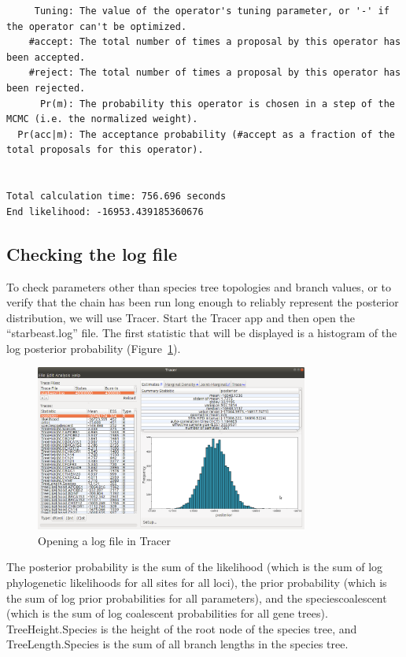 \documentclass[12pt]{article}
\begin{document}
\begin{verbatim}
     Tuning: The value of the operator's tuning parameter, or '-' if the operator can't be optimized.
    #accept: The total number of times a proposal by this operator has been accepted.
    #reject: The total number of times a proposal by this operator has been rejected.
      Pr(m): The probability this operator is chosen in a step of the MCMC (i.e. the normalized weight).
  Pr(acc|m): The acceptance probability (#accept as a fraction of the total proposals for this operator).


Total calculation time: 756.696 seconds
End likelihood: -16953.439185360676\end{verbatim}


\subsection{Checking the log file}
\label{subsec:checkLog}

To check parameters other than species tree topologies and branch values, or to verify
that the chain has been run long enough to reliably represent the posterior distribution,
we will use Tracer. Start the Tracer app and then open the ``starbeast.log'' file.
The first statistic that will be displayed is a histogram of the log posterior probability
(Figure~\ref{fig:tracerPosterior}).

\begin{figure}[htb!]
\centering
\includegraphics[width=0.8\textwidth]{figures/tracerPosterior.png}
\caption
{Opening a log file in Tracer}
\label{fig:tracerPosterior}
\end{figure}

The posterior probability is the sum of the likelihood (which is the sum of
log phylogenetic likelihoods for all sites for all loci), the prior
probability (which is the sum of log prior probabilities for all parameters),
and the speciescoalescent (which is the sum of log coalescent probabilities for
all gene trees). TreeHeight.Species is the height of the root node of the
species tree, and TreeLength.Species is the sum of all branch lengths in the
species tree.
\end{document}
